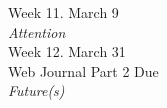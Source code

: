 \documentclass[10pt]{article}
\begin{document}
Week 11. March 9 \\
\textit{Attention} \\


%

Week 12. March 31 \\
Web Journal Part 2 Due \\
\textit{Future(s)} \\
\end{document}
